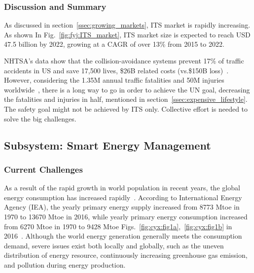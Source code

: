 \documentclass[letterpaper, twocolumn, 10pt, conference]{IEEEtran}
\begin{document}
\subsubsection{Discussion and Summary}
\label{sssec:gwy:ITS:discussion}

As discussed in section~\ref{ssec:growing_markets}, ITS market is rapidly increasing. As shown In Fig.~\ref{fig:fyj:ITS_market}, ITS market size is expected to reach USD 47.5 billion by 2022, growing at a CAGR of over 13\% from 2015 to 2022. 

NHTSA’s data show that the collision-avoidance systems prevent 17\% of traffic accidents in US and save 17,500 lives, \$26B related costs (vs.\$150B loss)~\cite{kaszynski2000american}. However, considering the 1.35M annual traffic fatalities and 50M injuries worldwide~\cite{fatal-accident}, there is a long way to go in order to achieve the UN goal, decreasing the fatalities and injuries in half, mentioned in section~\ref{ssec:expensive_lifestyle}. The safety goal might not be achieved by ITS only. Collective effort is needed to solve the big challenges. 







\subsection{Subsystem: Smart Energy Management} \label{ssec:cyx:smart_energy}


\subsubsection{Current Challenges}
\label{sssec:cyx:smart_energy:challenges}

As a result of the rapid growth in world population in recent years, the global energy consumption has increased rapidly~\cite{amasyali2018review}. According to International Energy Agency (IEA), the yearly primary energy supply increased from 8773 Mtoe in 1970 to 13670 Mtoe in 2016, while yearly primary energy consumption increased from 6270 Mtoe in 1970 to 9428 Mtoe Figs.~\ref{fig:cyx:fig1a},~\ref{fig:cyx:fig1b} in 2016~\cite{/content/publication/world_energy_bal-2018-en}. Although the world energy generation generally meets the consumption demand, severe issues exist both locally and globally, such as the uneven distribution of energy resource, continuously increasing greenhouse gas emission, and pollution during energy production. 
\end{document}
